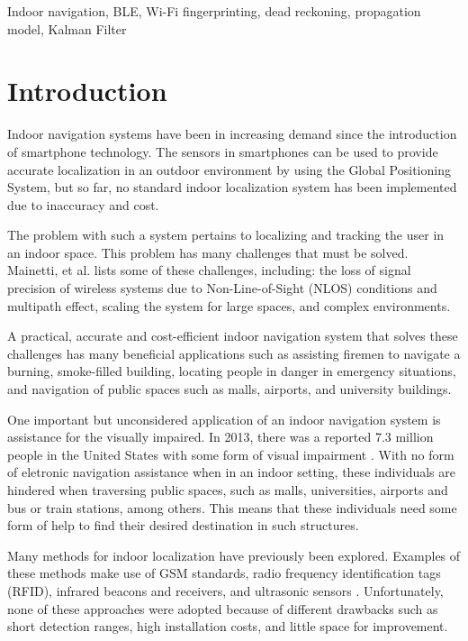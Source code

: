 \documentclass[conference]{IEEEtran}
\begin{document}
\begin{IEEEkeywords}
Indoor navigation, BLE, Wi-Fi fingerprinting, dead reckoning, propagation model, Kalman Filter
\end{IEEEkeywords}

\section{Introduction}
Indoor navigation systems have been in increasing demand since the introduction of smartphone technology. The sensors in smartphones can be used to provide accurate localization in an outdoor environment by using the Global Positioning System, but so far, no standard indoor localization system has been implemented due to inaccuracy and cost.

The problem with such a system pertains to localizing and tracking the user in an indoor space. This problem has many challenges that must be solved. Mainetti, et al. \cite{mainetti2014survey} lists some of these challenges, including: the loss of signal precision of wireless systems due to Non-Line-of-Sight (NLOS) conditions and multipath effect, scaling the system for large spaces, and complex environments.

A practical, accurate and cost-efficient indoor navigation system that solves these challenges has many beneficial applications such as assisting firemen to navigate a burning, smoke-filled building, locating people in danger in emergency situations, and navigation of public spaces such as malls, airports, and university buildings.

One important but unconsidered application of an indoor navigation system is assistance for the visually impaired. In 2013, there was a reported 7.3 million people in the United States with some form of visual impairment \cite{NFB}. With no form of eletronic navigation assistance when in an indoor setting, these individuals are hindered when traversing public spaces, such as malls, universities, airports and bus or train stations, among others. This means that these individuals need some form of help to find their desired destination in such structures.

Many methods for indoor localization have previously been explored. Examples of these methods make use of GSM standards, radio frequency identification tags (RFID), infrared beacons and receivers, and ultrasonic sensors \cite{otsason2005accurate,li2011performance,liu2014survey,ward1997new,medina2013ultrasound}. Unfortunately, none of these approaches were adopted because of different drawbacks such as short detection ranges, high installation costs, and little space for improvement.
\end{document}
